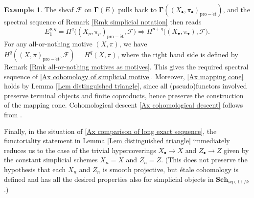 \documentclass[11pt]{amsart}
\theoremstyle{definition}
\newtheorem{Ex}[Thm]{Example}
\newcommand{\proet}{_{\operatorname{pro-\acute et}}}
\newcommand{\Ra}{\Rightarrow}
\newcommand{\Sch}{\mathbf{Sch}}
\begin{document}
\begin{Ex}
The sheaf $\mathscr F$ on $\mathbf \Gamma(E)$ pulls back to $\mathbf
\Gamma((X_\bullet,\pi_\bullet)\proet)$, and the spectral sequence of
Remark \ref{Rmk simplicial notation} then reads
\begin{equation*}
E_1^{p,q} = H^q\Big((X_p,\pi_p)\proet,\mathscr F\Big) \Ra
H^{p+q}\big((X_\bullet,\pi_\bullet),\mathscr F\big).
\end{equation*}
For any all-or-nothing motive $(X,\pi)$, we have
$H^q((X,\pi)\proet,\mathscr F) = H^q(X,\pi)$, where the right hand
side is defined by Remark \ref{Rmk all-or-nothing motives as
motives}. This gives the required spectral sequence of \ref{Ax
cohomology of simplicial motive}. Moreover, \ref{Ax mapping cone}
holds by Lemma \ref{Lem distinguished triangle}, since all
(pseudo)functors involved preserve terminal objects and finite
coproducts, hence preserve the construction of the mapping cone.
Cohomological descent \ref{Ax cohomological descent} follows from
\cite[exp.~V$^{\text{bis}}$, prop.~4.3.2, th.~3.3.3,
and~prop.~2.5.7]{SGA4II}.

Finally, in the situation of \ref{Ax comparison of long exact
sequence}, the functoriality statement in Lemma \ref{Lem
distinguished triangle} immediately reduces us to the case of the
trivial hypercoverings $X_\bullet \to X$ and $Z_\bullet \to Z$ given
by the constant simplicial schemes $X_n = X$ and $Z_n = Z$. (This
does not preserve the hypothesis that each $X_n$ and $Z_n$ is smooth
projective, but \'etale cohomology is defined and has all the
desired properties also for simplicial objects in $\Sch_{\text{sep,
f.t.}/k}$.)


\end{Ex}
\end{document}
